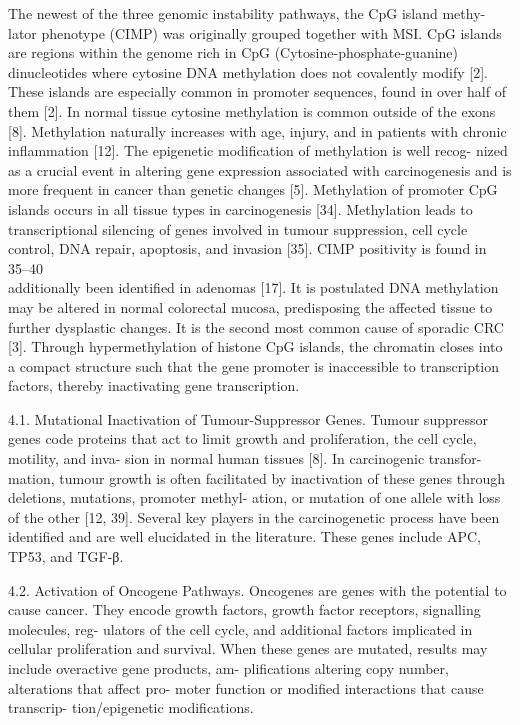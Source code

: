   The newest of the three genomic instability pathways, the CpG island methy-
  lator phenotype (CIMP) was originally grouped together with MSI. CpG islands
  are regions within the genome rich in CpG (Cytosine-phosphate-guanine)
  dinucleotides where cytosine DNA methylation does not covalently modify [2].
  These islands are especially common in promoter sequences, found in over half
  of them [2]. In normal tissue cytosine methylation is common outside of the
  exons [8]. Methylation naturally increases with age, injury, and in patients
  with chronic inflammation [12]. The epigenetic modification of methylation is
  well recog- nized as a crucial event in altering gene expression associated
  with carcinogenesis and is more frequent in cancer than genetic changes [5].
  Methylation of promoter CpG islands occurs in all tissue types in
  carcinogenesis [34]. Methylation leads to transcriptional silencing of genes
  involved in tumour suppression, cell cycle control, DNA repair, apoptosis, and
  invasion [35]. CIMP positivity is found in 35–40\\%
  additionally been identified in adenomas [17]. It is postulated DNA
  methylation may be altered in normal colorectal mucosa, predisposing the
  affected tissue to further dysplastic changes. It is the second most common
  cause of sporadic CRC [3]. Through hypermethylation of histone CpG islands,
  the chromatin closes into a compact structure such that the gene promoter is
  inaccessible to transcription factors, thereby inactivating gene
  transcription.

  4.1. Mutational Inactivation of Tumour-Suppressor Genes.
    Tumour suppressor genes code proteins that act to limit growth and
    proliferation, the cell cycle, motility, and inva- sion in normal human tissues
    [8]. In carcinogenic transfor- mation, tumour growth is often facilitated by
    inactivation of these genes through deletions, mutations, promoter methyl-
    ation, or mutation of one allele with loss of the other [12, 39]. Several key
    players in the carcinogenetic process have been identified and are well
    elucidated in the literature. These genes include APC, TP53, and TGF-β.

  4.2. Activation of Oncogene Pathways. Oncogenes are genes with the potential
    to cause cancer. They encode growth factors, growth factor receptors,
    signalling molecules, reg- ulators of the cell cycle, and additional factors
    implicated in cellular proliferation and survival. When these genes are
    mutated, results may include overactive gene products, am- plifications
    altering copy number, alterations that affect pro- moter function or modified
    interactions that cause transcrip- tion/epigenetic modifications.

